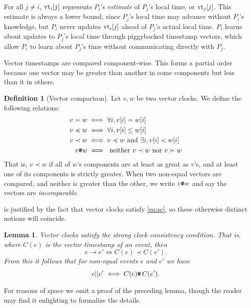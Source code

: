 \documentclass[]             %
{NASA}                       %
\newtheorem{lemma}[theorem]{Lemma}
\theoremstyle{definition}
\newtheorem{definition}[theorem]{Definition}
\begin{document}
For all $j \neq i$, $\textrm{vt}_i[j]$ represents $P_i$'s \emph{estimate} of
$P_j$'s local time, or $\textrm{vt}_j[j]$. This estimate is always a lower
bound, since $P_j$'s local time may advance without $P_i$'s knowledge,
but $P_i$ never updates $\textrm{vt}_i[j]$ ahead of $P_j$'s actual local
time. $P_i$ learns about updates to $P_j$'s local time through
piggybacked timestamp vectors, which allow $P_i$ to learn about
$P_j$'s time without communicating directly with $P_j$.

Vector timestamps are compared component-wise. This forms a partial
order because one vector may be greater than another in some
components but less than it in others.

\begin{definition}[Vector comparison]
  Let $v, w$ be two vector clocks. We define the following relations:
  \begin{align*}
             v = w &\iff \forall i, v[i] = w[i] \\
  v \preccurlyeq w &\iff \forall i, v[i] \leq w[i] \\
         v \prec w &\iff v \preccurlyeq w \textrm{ and } \exists i, v[i] < w[i] \\
            v {\textrm{\texttt{\#}}} w &\iff \textrm{ neither } v \prec w \textrm{ nor } v \succ w
  \end{align*}
  That is, $v \prec w$ if all of $w$'s components are at least as
  great as $v$'s, and at least one of its components is strictly
  greater. When two non-equal vectors are compared, and neither is
  greater than the other, we write $v {\textrm{\texttt{\#}}} w$ and say the vectors
  are \emph{incomparable}.
\end{definition}

 is justified by the fact that vector
clocks satisfy \ref{eq:sc}, so these otherwise distinct notions will
coincide.

\begin{lemma}
  Vector clocks satisfy the strong clock consistency condition. That
  is, where $C(e)$ is the vector timestamp of an event, then
  \[ e \to e' \iff C(e) \prec C(e'). \]
  From this it follows that for non-equal events $e$ and $e'$ we have
  \[e || e' \iff {C(e) \texttt{\#}\,C(e')}. \]%
\end{lemma}

For reasons of space we omit a proof of the preceding lemma, though
the reader may find it enlighting to formalize the details.
\end{document}
